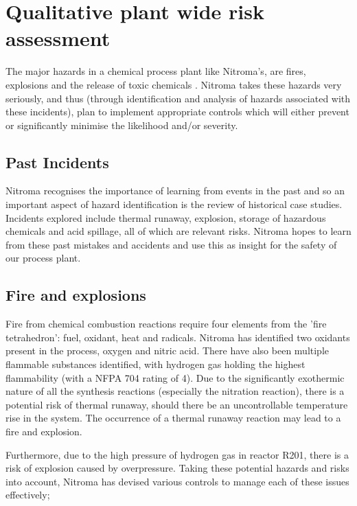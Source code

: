 \section{Qualitative plant wide risk assessment}

The major hazards in a chemical process plant like Nitroma’s, are fires, explosions and the release of toxic chemicals \cite{mannan_lees_2012}. Nitroma takes these hazards very seriously, and thus (through identification and analysis of hazards associated with these incidents), plan to implement appropriate controls which will either prevent or significantly minimise the likelihood and/or severity. 


\subsection{Past Incidents}

Nitroma recognises the importance of learning from events in the past and so an important aspect of hazard identification is the review of historical case studies. Incidents explored include thermal runaway, explosion, storage of hazardous chemicals and acid spillage, all of which are relevant risks. Nitroma hopes to learn from these past mistakes and accidents and use this as insight for the safety of our process plant.

\subsection{Fire and explosions}

Fire from chemical combustion reactions require four elements from the 'fire tetrahedron': fuel, oxidant, heat and radicals. Nitroma has identified two oxidants present in the process, oxygen and nitric acid. There have also been multiple flammable substances identified, with hydrogen gas holding the highest flammability (with a NFPA 704 rating of 4). Due to the significantly exothermic nature of all the synthesis reactions (especially the nitration reaction), there is a potential risk of thermal runaway, should there be an uncontrollable temperature rise in the system. The occurrence of a thermal runaway reaction may lead to a fire and explosion.  

Furthermore, due to the high pressure of hydrogen gas in reactor R201, there is a risk of explosion caused by overpressure. Taking these potential hazards and risks into account, Nitroma has devised various controls to manage each of these issues effectively; 



